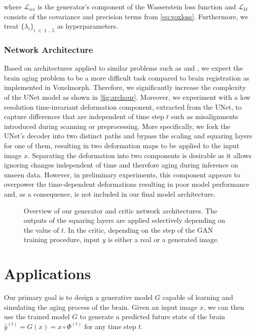 where $\mathcal{L}_{ws}$ is the generator's component of the Wasserstein loss function and $\mathcal{L}_{kl}$ consists of the covariance and precision terms from \autoref{eq:voxloss}. Furthermore, we treat $ \{ \lambda_i \}_{i\;\in\;1\;..\;5}$ as hyperparameters.

\subsection{Network Architecture}
Based on architectures applied to similar problems such as \cite{wegmayr2019generative} and \cite{baumgartner2018visual}, we expect the brain aging problem to be a more difficult task compared to brain registration as implemented in Voxelmorph. Therefore, we significantly increase the complexity of the UNet model as shown in \autoref{fig:archour}.
Moreover, we experiment with a low resolution time-invariant deformation component, extracted from the UNet, to capture differences that are independent of time step $t$ such as misalignments introduced during scanning or preprocessing. More specifically, we fork the UNet's decoder into two distinct paths and bypass the scaling and squaring layers for one of them, resulting in two deformation maps to be applied to the input image $x$. Separating the deformation into two components is desirable as it allows ignoring changes independent of time and therefore aging during inference on unseen data.
However, in preliminary experiments, this component appears to overpower the time-dependent deformations resulting in poor model performance and, as a consequence, is not included in our final model architecture.

\begin{figure}
	\centering
	
	\caption{Overview of our generator and critic network architectures. The outputs of the squaring layers are applied selectively depending on the value of $t$. In the critic, depending on the step of the GAN training procedure, input $y$ is either a real or a generated image.}
	\label{fig:archour}
\end{figure}

\chapter{Applications}
Our primary goal is to design a generative model $G$ capable of learning and simulating the aging process of the brain. Given an input image $x$, we can then use the trained model $G$ to generate a predicted future state of the brain $\hat y^{(t)} = G(x) = x \circ \Phi^{(t)}$ for any time step $t$.

